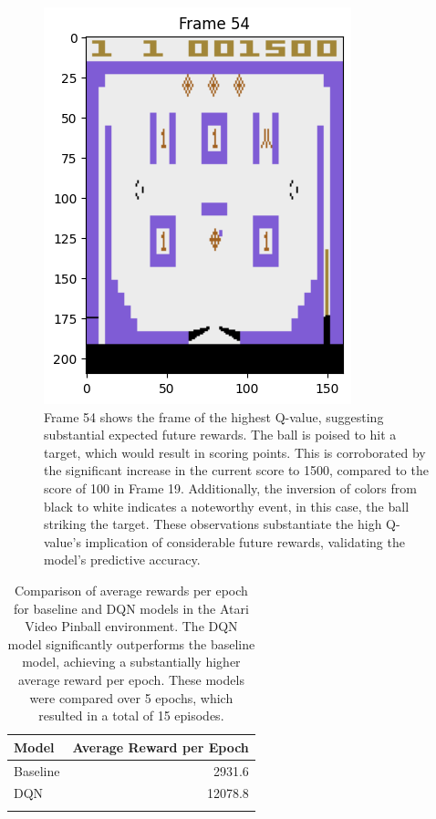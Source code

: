 \begin{figure}
    \centering
    \includegraphics[width=0.7\linewidth]{graphics/frame54.png}
    \caption{Frame 54 shows the frame of the highest Q-value, suggesting substantial expected future rewards. The ball is poised to hit a target, which would result in scoring points. This is corroborated by the significant increase in the current score to 1500, compared to the score of 100 in Frame 19. Additionally, the inversion of colors from black to white indicates a noteworthy event, in this case, the ball striking the target. These observations substantiate the high Q-value's implication of considerable future rewards, validating the model's predictive accuracy.}
    \label{fig: frame54}
\end{figure}




\begin{table}[!h]
    \centering
    \begin{tabular}{lr}
        \toprule
         \textbf{Model} & \textbf{Average Reward per Epoch} 
         \\ \midrule
         Baseline & 2931.6  \\ \addlinespace
         DQN & 12078.8 \\ \addlinespace
         \bottomrule
    \end{tabular}
    \caption{Comparison of average rewards per epoch for baseline and DQN models in the Atari Video Pinball environment. The DQN model significantly outperforms the baseline model, achieving a substantially higher average reward per epoch. These models were compared over 5 epochs, which resulted in a total of 15 episodes.}
    \label{tab: results}
\end{table}
